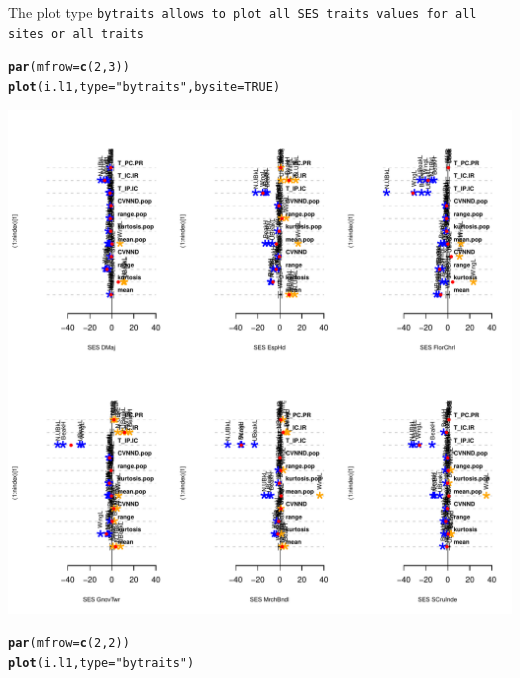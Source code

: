 \documentclass[12pt]{article}\usepackage[]{graphicx}\usepackage[]{color}
\makeatletter
\def\maxwidth{ %
  \ifdim\Gin@nat@width>\linewidth
    \linewidth
  \else
    \Gin@nat@width
  \fi
}
\newcommand{\hlnum}[1]{\textcolor[rgb]{0.686,0.059,0.569}{#1}}%
\newcommand{\hlstr}[1]{\textcolor[rgb]{0.192,0.494,0.8}{#1}}%
\newcommand{\hlstd}[1]{\textcolor[rgb]{0.345,0.345,0.345}{#1}}%
\newcommand{\hlkwc}[1]{\textcolor[rgb]{0.333,0.667,0.333}{#1}}%
\newcommand{\hlkwd}[1]{\textcolor[rgb]{0.737,0.353,0.396}{\textbf{#1}}}%
\newenvironment{kframe}{%
 \def\at@end@of@kframe{}%
 \ifinner\ifhmode%
  \def\at@end@of@kframe{\end{minipage}}%
  \begin{minipage}{\columnwidth}%
 \fi\fi%
 \def\FrameCommand##1{\hskip\@totalleftmargin \hskip-\fboxsep
 \colorbox{shadecolor}{##1}\hskip-\fboxsep
     \hskip-\linewidth \hskip-\@totalleftmargin \hskip\columnwidth}%
 \MakeFramed {\advance\hsize-\width
   \@totalleftmargin\z@ \linewidth\hsize
   \@setminipage}}%
 {\par\unskip\endMakeFramed%
 \at@end@of@kframe}
\newenvironment{knitrout}{}{} %
\makeatother
\begin{document}
The plot type \tt{bytraits} allows to plot all SES traits values for all sites or all traits
\begin{knitrout}
\color{fgcolor}\begin{kframe}
\begin{alltt}
\hlkwd{par}\hlstd{(}\hlkwc{mfrow}\hlstd{=}\hlkwd{c}\hlstd{(}\hlnum{2}\hlstd{,}\hlnum{3}\hlstd{))}
\hlkwd{plot}\hlstd{(i.l1,}\hlkwc{type}\hlstd{=}\hlstr{"bytraits"}\hlstd{,} \hlkwc{bysite}\hlstd{=}\hlnum{TRUE}\hlstd{)}
\end{alltt}
\end{kframe}
\includegraphics[width=\maxwidth]{figure/unnamed-chunk-421} 
\begin{kframe}\begin{alltt}
\hlkwd{par}\hlstd{(}\hlkwc{mfrow}\hlstd{=}\hlkwd{c}\hlstd{(}\hlnum{2}\hlstd{,}\hlnum{2}\hlstd{))}
\hlkwd{plot}\hlstd{(i.l1,}\hlkwc{type}\hlstd{=}\hlstr{"bytraits"}\hlstd{)}
\end{alltt}
\end{kframe}

\end{knitrout}
\end{document}
